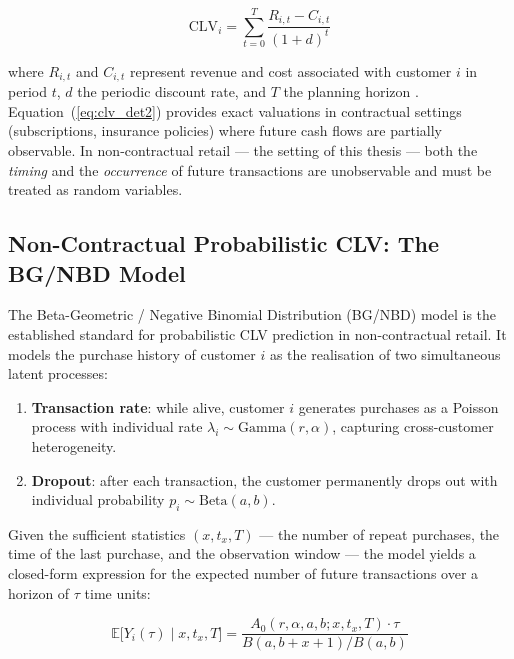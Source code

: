 \begin{equation}
    \text{CLV}_i = \sum_{t=0}^{T} \frac{R_{i,t} - C_{i,t}}{(1 + d)^t}
    \label{eq:clv_det2}
\end{equation}

where $R_{i,t}$ and $C_{i,t}$ represent revenue and cost associated with customer $i$ in period $t$, $d$ the periodic discount rate, and $T$ the planning horizon \cite{Blattberg2001}. Equation~(\ref{eq:clv_det2}) provides exact valuations in contractual settings (subscriptions, insurance policies) where future cash flows are partially observable. In non-contractual retail — the setting of this thesis — both the \textit{timing} and the \textit{occurrence} of future transactions are unobservable and must be treated as random variables.

\subsection{Non-Contractual Probabilistic CLV: The BG/NBD Model}

The Beta-Geometric / Negative Binomial Distribution (BG/NBD) model \cite{FaderHardieLee2005} is the established standard for probabilistic CLV prediction in non-contractual retail. It models the purchase history of customer $i$ as the realisation of two simultaneous latent processes:

\begin{enumerate}[noitemsep]
    \item \textbf{Transaction rate}: while alive, customer $i$ generates purchases as a Poisson process with individual rate $\lambda_i \sim \text{Gamma}(r, \alpha)$, capturing cross-customer heterogeneity.
    \item \textbf{Dropout}: after each transaction, the customer permanently drops out with individual probability $p_i \sim \text{Beta}(a, b)$.
\end{enumerate}

Given the sufficient statistics $(x, t_x, T)$ — the number of repeat purchases, the time of the last purchase, and the observation window — the model yields a closed-form expression for the expected number of future transactions over a horizon of $\tau$ time units:

\begin{equation}
    \mathbb{E}\bigl[Y_i(\tau) \mid x, t_x, T\bigr] = \frac{A_0(r, \alpha, a, b; x, t_x, T) \cdot \tau}{B(a, b+x+1)/B(a,b)}
    \label{eq:bgnbd_forecast}
\end{equation}


